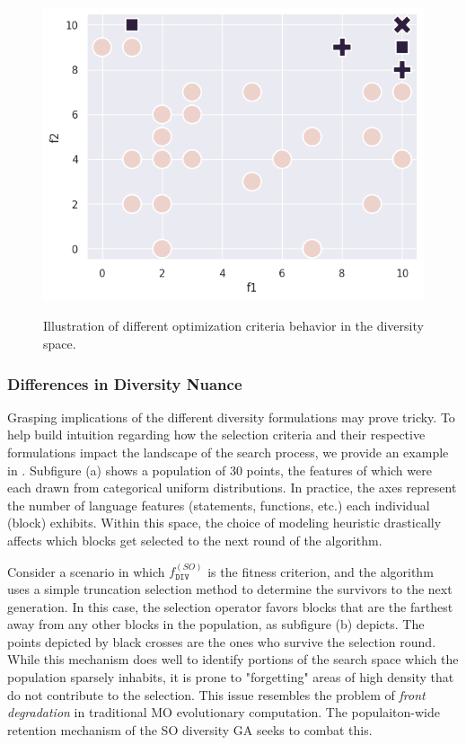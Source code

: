 \begin{figure}[t!]
{\includegraphics[scale=0.27]{img/diversity_mo_selection.png}
}

\caption{Illustration of different optimization criteria behavior in the diversity space.}
\label{fig:diversity}
\end{figure}

\subsubsection{\label{subsec:diversity-example}Differences in Diversity Nuance}

Grasping implications of the different diversity formulations
may prove tricky.
To help build intuition regarding how the selection
criteria and their respective formulations
impact the landscape of the search process, we provide an example in .
Subfigure (a) shows a population of 30 points, the features of which
were each drawn from categorical uniform distributions.
In practice, the axes represent the number of language
features (statements, functions, etc.)
each individual (block) exhibits.
Within this space, the choice of modeling heuristic drastically affects
which blocks get selected to the next round of the algorithm.

Consider a scenario in which $f^{(SO)}_{\texttt{DIV}}$ is the fitness criterion,
and the algorithm uses a simple truncation selection method
to determine the survivors to the next generation.
In this case, the selection operator favors
blocks that are the farthest away
from any other blocks in the population, as subfigure (b) depicts.
The points depicted by black crosses are the ones
who survive the selection round.
While this mechanism does well to identify 
portions of the search space which the population
sparsely inhabits, it is prone to "forgetting"
areas of high density that do not contribute to the selection.
This issue resembles the problem of \textit{front degradation}
in traditional \Gls{MO} evolutionary computation.
The populaiton-wide retention mechanism of the \gls{SO} diversity
\gls{GA} seeks to combat this.

